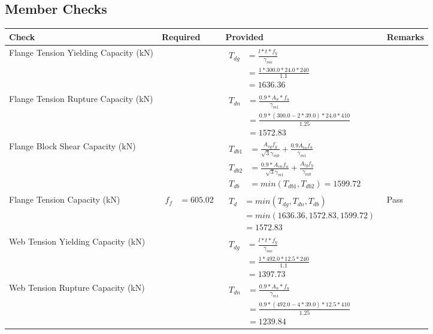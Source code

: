 \documentclass{article}%
\begin{document}
%
\newpage%
\subsection{Member Checks}%
\label{subsec:MemberChecks}%
\renewcommand{\arraystretch}{1.2}%
\begin{longtable}{|p{4cm}|p{6cm}|p{5.5cm}|p{1.5cm}|}%
\hline%
\rowcolor{OsdagGreen}%
Check&Required&Provided&Remarks\\%
\hline%
\endhead%
\hline%
Flange Tension Yielding Capacity (kN)&&$\begin{aligned} T_{dg} &= \frac{l*t*f_y}{\gamma_{mo}}\\ &=\frac{1*300.0*24.0*240}{1.1}\\ &=1636.36\end{aligned}$&\\%
\hline%
Flange Tension Rupture Capacity (kN)&&$\begin{aligned} T_{dn} &= \frac{0.9*A_{n}*f_u}{\gamma_{m1}}\\ &=\frac{0.9*(300.0-2*39.0)*24.0*410}{1.25}\\ &=1572.83\end{aligned}$&\\%
\hline%
Flange Block Shear Capacity (kN)&&$\begin{aligned}T_{db1} &= \frac{A_{vg} f_{y}}{\sqrt{3} \gamma_{m0}} + \frac{0.9 A_{tn} f_{u}}{\gamma_{m1}}\\ T_{db2} &= \frac{0.9*A_{vn} f_{u}}{\sqrt{3} \gamma_{m1}} + \frac{A_{tg} f_{y}}{\gamma_{m0}}\\ T_{db} &= min(T_{db1}, T_{db2})= 1599.72\end{aligned}$&\\%
\hline%
Flange Tension Capacity (kN)&$\begin{aligned} f_f &=605.02\end{aligned}$&$\begin{aligned} T_d &= min(T_{dg},T_{dn},T_{db})\\ &= min(1636.36,1572.83,1599.72)\\ &=1572.83\end{aligned}$&Pass\\%
\hline%
Web Tension Yielding Capacity (kN)&&$\begin{aligned} T_{dg} &= \frac{l*t*f_y}{\gamma_{mo}}\\ &=\frac{1*492.0*12.5*240}{1.1}\\ &=1397.73\end{aligned}$&\\%
\hline%
Web Tension Rupture Capacity (kN)&&$\begin{aligned} T_{dn} &= \frac{0.9*A_{n}*f_u}{\gamma_{m1}}\\ &=\frac{0.9*(492.0-4*39.0)*12.5*410}{1.25}\\ &=1239.84\end{aligned}$&\\%

\end{longtable}
\end{document}
